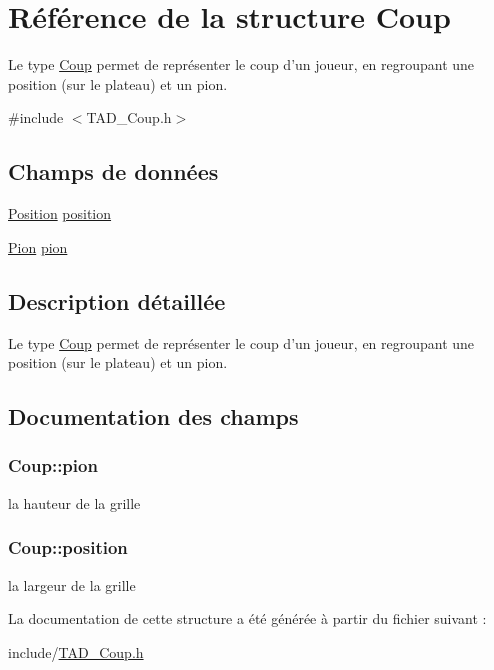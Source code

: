 \hypertarget{structCoup}{\section{Référence de la structure Coup}
\label{structCoup}
}


Le type \hyperlink{structCoup}{Coup} permet de représenter le coup d'un joueur, en regroupant une position (sur le plateau) et un pion.  




{\ttfamily \#include $<$T\-A\-D\-\_\-\-Coup.\-h$>$}

\subsection*{Champs de données}
\begin{DoxyCompactItemize}
\item 
\hyperlink{structPosition}{Position} \hyperlink{structCoup_a53a5b29ee8fde3fa1c9fbc220e2f5a56}{position}
\item 
\hyperlink{structPion}{Pion} \hyperlink{structCoup_a7ea419a72425aac1787544df22a9d159}{pion}
\end{DoxyCompactItemize}


\subsection{Description détaillée}
Le type \hyperlink{structCoup}{Coup} permet de représenter le coup d'un joueur, en regroupant une position (sur le plateau) et un pion. 

\subsection{Documentation des champs}
\hypertarget{structCoup_a7ea419a72425aac1787544df22a9d159}{
\subsubsection[{pion}]{ Coup\-::pion}}\label{structCoup_a7ea419a72425aac1787544df22a9d159}
la hauteur de la grille \hypertarget{structCoup_a53a5b29ee8fde3fa1c9fbc220e2f5a56}{
\subsubsection[{position}]{ Coup\-::position}}\label{structCoup_a53a5b29ee8fde3fa1c9fbc220e2f5a56}
la largeur de la grille 

La documentation de cette structure a été générée à partir du fichier suivant \-:\begin{DoxyCompactItemize}
\item 
include/\hyperlink{TAD__Coup_8h}{T\-A\-D\-\_\-\-Coup.\-h}\end{DoxyCompactItemize}
